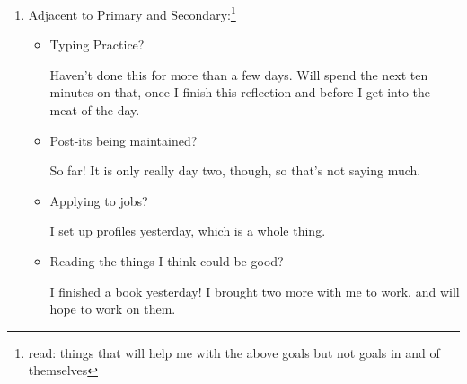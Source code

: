 \documentclass[12pt]{article}
\renewcommand{\,}{\textsuperscript{,}}
\begin{document}
\begin{enumerate}
\begin{itemize}
\begin{itemize}
Nope!

\item Making efforts?

Nope!

\item Showing affection?

No more than usual. Should message a friend.

\item Being honest?

I think so! Very little of people asking how I'm doing, so very little by way of opportunity to do so.

\item Being open?

I think so! I'm trying to vocalize what I want and need, and in general am getting what I need.\footnote{though tragically, not the mug I so desperately crave}

\item Being appropriately vulnerable?

I think so! Again, few chances for it, and so few places that I show it.

\end{itemize}

\end{itemize}

\item Adjacent to Primary and Secondary:\footnote{read: things that will help me with the above goals but not goals in and of themselves}

\begin{itemize}

\item Typing Practice?

Haven't done this for more than a few days. Will spend the next ten minutes on that, once I finish this reflection and before I get into the meat of the day.

\item Post-its being maintained?

So far! It is only really day two, though, so that's not saying much.

\item Applying to jobs?

I set up profiles yesterday, which is a whole thing.

\item Reading the things I think could be good?

I finished a book yesterday!  
I brought two more with me to work, and will hope to work on them.


\end{itemize}
\end{enumerate}
\end{document}
